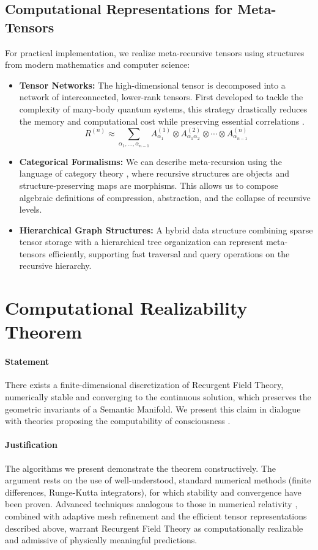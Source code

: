 \subsection{Computational Representations for Meta-Tensors}
For practical implementation, we realize meta-recursive tensors using structures from modern mathematics and computer science:
\begin{itemize}
    \item \textbf{Tensor Networks:} The high-dimensional tensor is decomposed into a network of interconnected, lower-rank tensors. First developed to tackle the complexity of many-body quantum systems, this strategy drastically reduces the memory and computational cost while preserving essential correlations \autocite{Orus2014}.
    \begin{equation}
    R^{(n)} \approx \sum_{\alpha_1, \ldots, \alpha_{n-1}} A^{(1)}_{\alpha_1} \otimes A^{(2)}_{\alpha_1 \alpha_2} \otimes \cdots \otimes A^{(n)}_{\alpha_{n-1}}
    \end{equation}
    \item \textbf{Categorical Formalisms:} We can describe meta-recursion using the language of category theory \autocite{MacLane1998}, where recursive structures are objects and structure-preserving maps are morphisms. This allows us to compose algebraic definitions of compression, abstraction, and the collapse of recursive levels.
    \item \textbf{Hierarchical Graph Structures:} A hybrid data structure combining sparse tensor storage with a hierarchical tree organization can represent meta-tensors efficiently, supporting fast traversal and query operations on the recursive hierarchy.
\end{itemize}

\section{Computational Realizability Theorem}

\paragraph{Statement}
There exists a finite-dimensional discretization of Recurgent Field Theory, numerically stable and converging to the continuous solution, which preserves the geometric invariants of a Semantic Manifold. We present this claim in dialogue with theories proposing the computability of consciousness \autocite{KochConsciousness2019}.

\paragraph{Justification}
The algorithms we present demonstrate the theorem constructively. The argument rests on the use of well-understood, standard numerical methods (finite differences, Runge-Kutta integrators), for which stability and convergence have been proven. Advanced techniques analogous to those in numerical relativity \autocite{BaumgarteShapiro2010}, combined with adaptive mesh refinement and the efficient tensor representations described above, warrant Recurgent Field Theory as computationally realizable and admissive of physically meaningful predictions. 